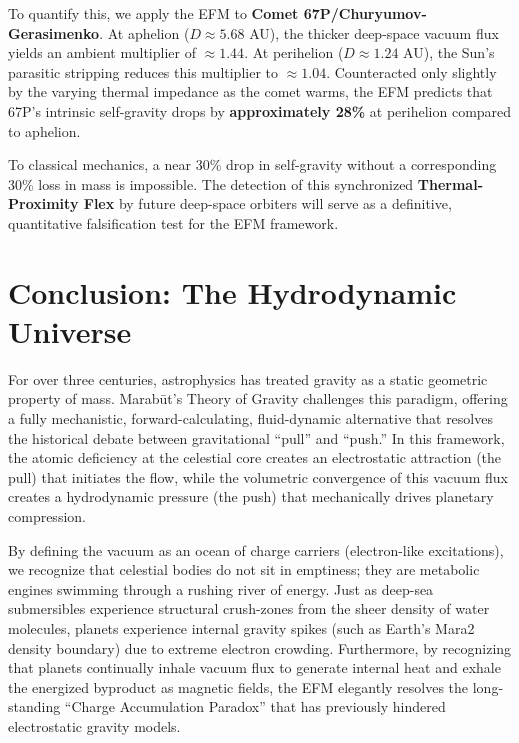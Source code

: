 \documentclass[11pt, a4paper]{article}
\begin{document}
To quantify this, we apply the EFM to \textbf{Comet 67P/Churyumov-Gerasimenko}. At aphelion ($D \approx 5.68$ AU), the thicker deep-space vacuum flux yields an ambient multiplier of $\approx 1.44$. At perihelion ($D \approx 1.24$ AU), the Sun's parasitic stripping reduces this multiplier to $\approx 1.04$. Counteracted only slightly by the varying thermal impedance as the comet warms, the EFM predicts that 67P's intrinsic self-gravity drops by \textbf{approximately 28\%} at perihelion compared to aphelion. 

To classical mechanics, a near 30\% drop in self-gravity without a corresponding 30\% loss in mass is impossible. The detection of this synchronized \textbf{Thermal-Proximity Flex} by future deep-space orbiters will serve as a definitive, quantitative falsification test for the EFM framework.

\section{Conclusion: The Hydrodynamic Universe}

For over three centuries, astrophysics has treated gravity as a static geometric property of mass. Marab\={u}t's Theory of Gravity challenges this paradigm, offering a fully mechanistic, forward-calculating, fluid-dynamic alternative that resolves the historical debate between gravitational ``pull'' and ``push.'' In this framework, the atomic deficiency at the celestial core creates an electrostatic attraction (the pull) that initiates the flow, while the volumetric convergence of this vacuum flux creates a hydrodynamic pressure (the push) that mechanically drives planetary compression.

By defining the vacuum as an ocean of charge carriers (electron-like excitations), we recognize that celestial bodies do not sit in emptiness; they are metabolic engines swimming through a rushing river of energy. Just as deep-sea submersibles experience structural crush-zones from the sheer density of water molecules, planets experience internal gravity spikes (such as Earth's Mara2 density boundary) due to extreme electron crowding. Furthermore, by recognizing that planets continually inhale vacuum flux to generate internal heat and exhale the energized byproduct as magnetic fields, the EFM elegantly resolves the long-standing ``Charge Accumulation Paradox'' that has previously hindered electrostatic gravity models.
\end{document}
